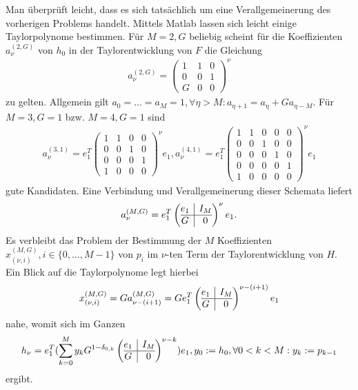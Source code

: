 \documentclass{article}
\theoremstyle{plain} %
\theoremstyle{definition} %
\begin{document}
Man überprüft leicht, dass es sich tatsächlich um eine Verallgemeinerung des vorherigen Problems handelt. Mittels Matlab lassen sich leicht einige Taylorpolynome bestimmen. Für $M=2, G$ beliebig scheint für die Koeffizienten $a_\nu^{(2,G)}$ von $h_0$ in der Taylorentwicklung von $F$ die Gleichung \begin{align*}
  a_\nu^{(2,G)} = \left(\begin{matrix}
      1 & 1 & 0 \\
      0 & 0 & 1 \\
      G & 0 & 0
    \end{matrix}\right)^\nu
\end{align*}
zu gelten. Allgemein gilt $a_0 = ... = a_M = 1, \forall \eta > M: a_{\eta+1} = a_\eta + G a_{\eta - M}$. Für $M = 3, G=1$ bzw. $M=4, G=1$ sind \begin{align*}
  a_\nu^{(3, 1)} = e_1^T \left(\begin{matrix}
      1 & 1 & 0 & 0 \\
      0 & 0 & 1 & 0 \\
      0 & 0 & 0 & 1 \\
      1 & 0 & 0 & 0
    \end{matrix}\right)^\nu e_1,
  a_\nu^{(4, 1)} = e_1^T \left(\begin{matrix}
      1 & 1 & 0 & 0 & 0 \\
      0 & 0 & 1 & 0 & 0 \\
      0 & 0 & 0 & 1 & 0 \\
      0 & 0 & 0 & 0 & 1 \\
      1 & 0 & 0 & 0 & 0
    \end{matrix}\right)^\nu e_1
\end{align*}
gute Kandidaten.
Eine Verbindung und Verallgemeinerung dieser Schemata liefert
\begin{align*}
  a_\nu^{(M,G)} = e_1^T \left( \begin{array}{@{}c|c@{}}
      e_1 & I_M \\
      \hline
      G   & 0
    \end{array}\right)^\nu e_1.
\end{align*}
Es verbleibt das Problem der Bestimmung der $M$ Koeffizienten $x_{(\nu,i)}^{(M,G)}, i \in \{0, ..., M-1\}$ von $p_i$ im $\nu$-ten Term der Taylorentwicklung von $H$. Ein Blick auf die Taylorpolynome legt hierbei \begin{align}
  x_{(\nu,i)}^{(M,G)} = G a_{\nu-(i + 1)}^{(M,G)} = G e_1^T \left( \begin{array}{@{}c|c@{}}
    e_1 & I_M \\
    \hline
    G   & 0
  \end{array}\right)^{\nu-(i+1)} e_1
\end{align}
nahe, womit sich im Ganzen \begin{align}
  h_\nu = e_1^T (\sum_{k=0}^{M} y_k G^{1-\delta_{0,k}} \left( \begin{array}{@{}c|c@{}}
    e_1 & I_M \\
    \hline
    G   & 0
  \end{array}\right)^{\nu-k}) e_1, y_0 := h_0, \forall 0 < k < M: y_k := p_{k-1}
\end{align}
ergibt.
\end{document}
